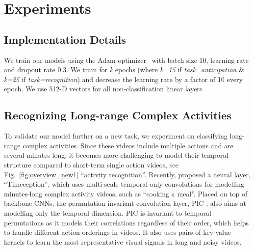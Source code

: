 \documentclass[10pt,twocolumn,letterpaper]{article}
\begin{document}
\section{Experiments}
\subsection{Implementation Details}
We train our models using the Adam optimizer~\cite{kingma2014adam} with batch size 10, learning rate  and dropout rate 0.3.
We train for {\it k} epochs (where {\it k=15} if {\it task=anticipation} \& {\it k=25} if {\it task=recognition}) and decrease the learning rate by a factor of 10 every  epoch.
We use 512-D vectors for all non-classification linear layers. 

 
\subsection{Recognizing Long-range Complex Activities}


To validate our model further on a new task, we experiment on classifying long-range complex activities.
Since these videos include multiple actions and are several minutes long, it becomes more challenging to model their temporal structure compared to short-term single action videos, see Fig.~\ref{fig:overview_new1} ``activity recognition''.
Recently, \cite{hussein2019timeception} proposed a neural layer, ``Timeception'', which uses multi-scale temporal-only convolutions for modelling minutes-long complex activity videos, such as ``cooking a meal''. 
Placed on top of backbone CNNs, the permutation invariant convolution layer, PIC \cite{hussein2020pic}, also aims at modelling only the temporal dimension.
PIC is invariant to temporal permutations as it models their correlations regardless of their order, which helps to handle different action orderings in videos.
It also uses pairs of key-value kernels to learn the most representative visual signals in long and noisy videos.


\begin{table}[t]
\centering
{}
\caption{Model parameters for activity recognition on Breakfast.}
\label{tab:my_label_breakfast}
\end{table} 
\end{document}
